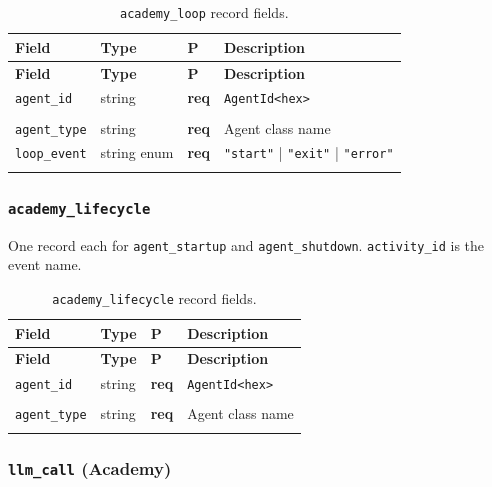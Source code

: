 \documentclass[11pt,a4paper]{article}
\newcommand{\req}{\textbf{req}}
\newcommand{\subtype}[1]{\texttt{\textcolor{subtypeblue}{#1}}}
\begin{document}
\begin{longtable}{L{4cm} L{2.5cm} C{1.2cm} L{6.5cm}}
\toprule
\textbf{Field} & \textbf{Type} & \textbf{P} & \textbf{Description} \\
\midrule
\endfirsthead
\toprule \textbf{Field} & \textbf{Type} & \textbf{P} & \textbf{Description} \\
\midrule
\endhead
\bottomrule
\endlastfoot

\texttt{agent\_id} & string & \req & \texttt{AgentId<hex>} \\
 \\
\texttt{agent\_type} & string & \req & Agent class name \\
\texttt{loop\_event}
  & string enum & \req & \texttt{"start"} | \texttt{"exit"} | \texttt{"error"} \\

\caption{\subtype{academy\_loop} record fields.}
\end{longtable}

\subsubsection{\subtype{academy\_lifecycle}}

One record each for \texttt{agent\_startup} and \texttt{agent\_shutdown}.
\texttt{activity\_id} is the event name.

\begin{longtable}{L{4cm} L{2.5cm} C{1.2cm} L{6.5cm}}
\toprule
\textbf{Field} & \textbf{Type} & \textbf{P} & \textbf{Description} \\
\midrule
\endfirsthead
\toprule \textbf{Field} & \textbf{Type} & \textbf{P} & \textbf{Description} \\
\midrule
\endhead
\bottomrule
\endlastfoot

\texttt{agent\_id} & string & \req & \texttt{AgentId<hex>} \\
 \\
\texttt{agent\_type} & string & \req & Agent class name \\

\caption{\subtype{academy\_lifecycle} record fields.}
\end{longtable}

\subsubsection{\subtype{llm\_call} (Academy)}
\label{sec:llm-academy}
\end{document}
